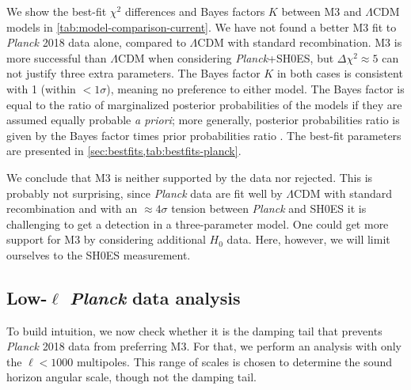 We show the best-fit $\chi^2$ differences and Bayes factors $K$ between M3 and $\Lambda$CDM models in \cref{tab:model-comparison-current}.
We have not found a better M3 fit to {\it Planck} 2018 data alone, compared to $\Lambda$CDM with standard recombination.
M3 is more successful than $\Lambda$CDM when considering {\it Planck}+SH0ES, but $\Delta\chi^2\approx 5$ can not justify three extra parameters.
The Bayes factor $K$ in both cases is consistent with 1 (within $<1\sigma$), meaning no preference to either model.
The Bayes factor is equal to the ratio of marginalized posterior probabilities of the models if they are assumed equally probable {\it a priori}; more generally, posterior probabilities ratio is given by the Bayes factor times prior probabilities ratio \citep{bayes-factors}.
The best-fit parameters are presented in \cref{sec:bestfits,tab:bestfits-planck}.

We conclude that M3 is neither supported by the data nor rejected.
This is probably not surprising, since {\it Planck} data are fit well by $\Lambda$CDM with standard recombination and with an $\approx 4\sigma$ tension between {\it Planck} and SH0ES it is challenging to get a detection in a three-parameter model.
One could get more support for M3 by considering additional $H_0$ data.
Here, however, we will limit ourselves to the SH0ES measurement.

\subsection{Low-\texorpdfstring{$\ell$}{l} {\it Planck} data analysis}

To build intuition, we now check whether it is the damping tail that prevents {\it Planck} 2018 data from preferring M3.
For that, we perform an analysis with only the $\ell<1000$ multipoles. 
This range of scales is chosen to determine the sound horizon angular scale, though not the damping tail.

